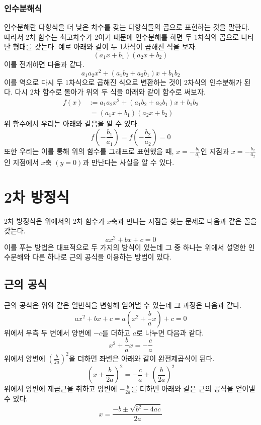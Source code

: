 \documentclass[twocolumn]{article}
\begin{document}
\subsubsection{인수분해식}
인수분해란 다항식을 더 낮은 차수를 갖는 다항식들의 곱으로 표현하는 것을 말한다.
따라서 2차 함수는 최고차수가 2이기 때문에 인수분해를 하면 두 1차식의 곱으로 나타난 형태를 갖는다.
예로 아래와 같이 두 1차식이 곱해진 식을 보자.
\[
(a_1x + b_1)(a_2x + b_2)
\]
이를 전개하면 다음과 같다.
\[
a_1a_2x^2 + (a_1b_2 + a_2b_1)x + b_1b_2
\]
이를 역으로 다시 두 1차식으로 곱해진 식으로 변환하는 것이 2차식의 인수분해가 된다.
다시 2차 함수로 돌아가 위의 두 식을 아래와 같이 함수로 써보자.
\begin{align*}
f(x) & :=a_1a_2x^2 + (a_1b_2 + a_2b_1)x + b_1b_2 \\
&\,= (a_1x + b_1)(a_2x + b_2)
\end{align*}
위 함수에서 우리는 아래와 같음을 알 수 있다.
\[
f(-\frac{b_1}{a_1}) = f(-\frac{b_2}{a_2}) = 0
\]
또한 우리는 이를 통해 위의 함수를 그래프로 표현했을 때,
$x=-\frac{b_1}{a_1}$인 지점과 $x=-\frac{b_2}{a_2}$인 지점에서
$x$축 $(y=0)$과 만난다는 사실을 알 수 있다.
\section{2차 방정식}
2차 방정식은 위에서의 2차 함수가 $x$축과 만나는 지점을 찾는 문제로 다음과 같은 꼴을 갖는다.
\[
ax^2 + bx + c = 0
\]
이를 푸는 방법은 대표적으로 두 가지의 방식이 있는데 그 중 하나는 위에서 설명한 인수분해와
다른 하나로 근의 공식을 이용하는 방법이 있다.
\subsection{근의 공식}
근의 공식은 위와 같은 일반식을 변형해 얻어낼 수 있는데 그 과정은 다음과 같다.
\[
    ax^2 + bx + c = a\left(x^2 + \frac{b}{a}x\right) + c = 0
\]
위에서 우측 두 변에서 양변에 $-c$를 더하고 $a$로 나누면 다음과 같다.
\[
    x^2 + \frac{b}{a}x = - \frac{c}{a}
\]
위에서 양변에 $\left(\frac{b}{2a}\right)^2$을 더하면 좌변은 아래와 같이 완전제곱식이 된다.
\[
    \left(x + \frac{b}{2a}\right)^2 = - \frac{c}{a} + \left(\frac{b}{2a}\right)^2
\]
위에서 양변에 제곱근을 취하고 양변에 $-\frac{b}{2a}$를 더하면 아래와 같은 근의 공식을 얻어낼 수 있다.
\[
    x = \frac{-b \pm \sqrt{b^2 - 4ac}}{2a}
\]
\end{document}
